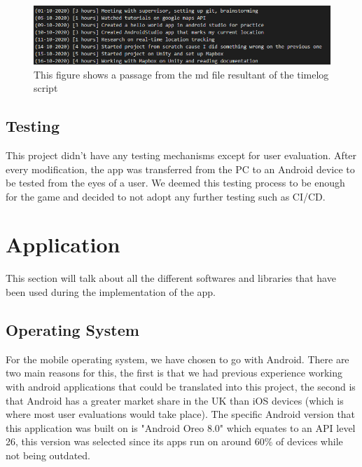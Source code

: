 \documentclass{dissertation}
\begin{document}
\begin{figure}[H]
\centering
\includegraphics[width = 13cm]{images/timelog-md.png}
\caption{This figure shows a passage from the md file resultant of the timelog script}
\label{fig:timelog-md}
\end{figure}

\subsection{Testing}
This project didn't have any testing mechanisms except for user evaluation. After every modification, the app was transferred from the PC to an Android device to be tested from the eyes of a user. We deemed this testing process to be enough for the game and decided to not adopt any further testing such as CI/CD.

\section{Application}

This section will talk about all the different softwares and libraries that have been used during the implementation of the app.

\subsection{Operating System}
For the mobile operating system, we have chosen to go with Android. There are two main reasons for this, the first is that we had previous experience working with android applications that could be translated into this project, the second is that Android has a greater market share in the UK than iOS devices \citep{Cohen20} (which is where most user evaluations would take place).
The specific Android version that this application was built on is "Android Oreo 8.0" which equates to an API level 26, this version was selected since its apps run on around 60\% of devices while not being outdated.
\end{document}
